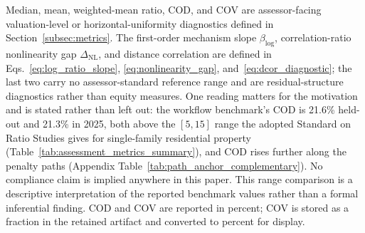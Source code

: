 \documentclass[10pt]{article}
\theoremstyle{definition}
\newcommand{\1}{\mathbf{1}}
\begin{document}
\begin{table}[!htbp]
\begin{minipage}{\textwidth}
Median, mean, weighted-mean ratio, COD, and COV are assessor-facing valuation-level or horizontal-uniformity diagnostics defined in Section~\ref{subsec:metrics}. The first-order mechanism slope $\beta_{\log}$, correlation-ratio nonlinearity gap $\Delta_{\mathrm{NL}}$, and distance correlation are defined in Eqs.~\eqref{eq:log_ratio_slope}, \eqref{eq:nonlinearity_gap}, and~\eqref{eq:dcor_diagnostic}; the last two carry no assessor-standard reference range and are residual-structure diagnostics rather than equity measures.
One reading matters for the motivation and is stated rather than left out: the workflow benchmark's COD is 21.6\% held-out and 21.3\% in 2025, both above the $[5,15]$ range the adopted Standard on Ratio Studies gives for single-family residential property (Table~\ref{tab:assessment_metrics_summary}), and COD rises further along the penalty paths (Appendix Table~\ref{tab:path_anchor_complementary}). No compliance claim is implied anywhere in this paper. This range comparison is a descriptive interpretation of the reported benchmark values rather than a formal inferential finding.
COD and COV are reported in percent; COV is stored as a fraction in the retained artifact and converted to percent for display.
\end{minipage}
\end{table}
\end{document}
